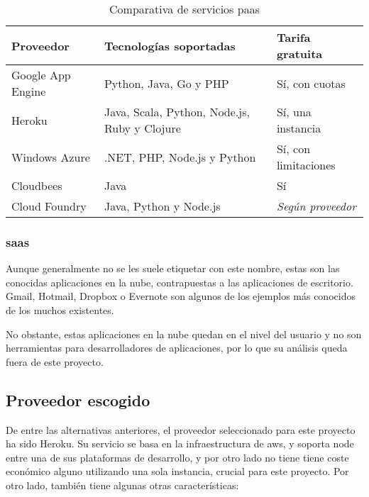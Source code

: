\documentclass[main]{subfiles}
\begin{document}
\begin{table}
  \centering
  \begin{tabulary}{\textwidth}{L L L}
    \toprule
    \textbf{Proveedor} & \textbf{Tecnologías soportadas} & \textbf{Tarifa gratuita} \tabularnewline
    \midrule
    Google App Engine & Python, Java, Go y PHP & Sí, con cuotas \tabularnewline
    Heroku & Java, Scala, Python, Node.js, Ruby y Clojure & Sí, una instancia \tabularnewline
    Windows Azure & .NET, PHP, Node.js y Python & Sí, con limitaciones \tabularnewline
    Cloudbees & Java & Sí \tabularnewline
    Cloud Foundry & Java, Python y Node.js & \emph{Según proveedor} \tabularnewline
    \bottomrule
  \end{tabulary}
  \caption[Comparativa de servicios \acrshort*{paas}]{Comparativa de servicios \gls{paas}}
  \label{tab:paas}
\end{table}


\subsubsection[\Acrshort{saas}]{\Acrlong{saas}}
Aunque generalmente no se les suele etiquetar con este nombre, estas son las conocidas aplicaciones en la nube, contrapuestas a las aplicaciones de escritorio. Gmail, Hotmail, Dropbox o Evernote son algunos de los ejemplos más conocidos de los muchos existentes.

No obstante, estas aplicaciones en la nube quedan en el nivel del usuario y no son herramientas para desarrolladores de aplicaciones, por lo que su análisis queda fuera de este proyecto.

\subsection{Proveedor escogido}

De entre las alternativas anteriores, el proveedor seleccionado para este proyecto ha sido Heroku. Su servicio se basa en la infraestructura de \gls{aws}, y soporta \gls{node} entre una de sus plataformas de desarrollo, y por otro lado no tiene tiene coste económico alguno utilizando una sola instancia, crucial para este proyecto. Por otro lado, también tiene algunas otras características:
\end{document}
